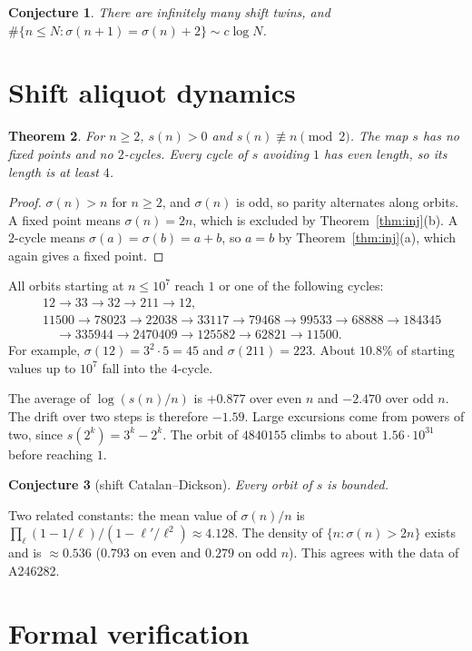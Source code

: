 \documentclass[11pt]{amsart}
\newtheorem{theorem}{Theorem}[section]
\newtheorem{conjecture}[theorem]{Conjecture}
\theoremstyle{remark}
\newcommand{\s}{\sigma}
\newcommand{\nx}[1]{#1'}
\begin{document}
\begin{conjecture}
There are infinitely many shift twins, and $\#\{n\le N: \s(n+1)=\s(n)+2\}\sim c\log N$.
\end{conjecture}

\section{Shift aliquot dynamics}

\begin{theorem}\label{thm:aliq}
For $n\ge2$, $s(n)>0$ and $s(n)\not\equiv n\pmod 2$. The map $s$ has no fixed points and no $2$-cycles. Every cycle of $s$ avoiding $1$ has even length, so its length is at least $4$.
\end{theorem}
\begin{proof}
$\s(n)>n$ for $n\ge2$, and $\s(n)$ is odd, so parity alternates along orbits. A fixed point means $\s(n)=2n$, which is excluded by Theorem~\ref{thm:inj}(b). A $2$-cycle means $\s(a)=\s(b)=a+b$, so $a=b$ by Theorem~\ref{thm:inj}(a), which again gives a fixed point.
\end{proof}

All orbits starting at $n\le 10^7$ reach $1$ or one of the following cycles:
\begin{align*}
&12\to33\to32\to211\to12,\\
&11500\to78023\to22038\to33117\to79468\to99533\to68888\to184345\\
&\quad\to335944\to2470409\to125582\to62821\to11500.
\end{align*}
For example, $\s(12)=3^2\cdot5=45$ and $\s(211)=223$. About $10.8\%$ of starting values up to $10^7$ fall into the $4$-cycle.

The average of $\log(s(n)/n)$ is $+0.877$ over even $n$ and $-2.470$ over odd $n$. The drift over two steps is therefore $-1.59$. Large excursions come from powers of two, since $s(2^k)=3^k-2^k$. The orbit of $4840155$ climbs to about $1.56\cdot10^{31}$ before reaching $1$.

\begin{conjecture}[shift Catalan--Dickson]
Every orbit of $s$ is bounded.
\end{conjecture}

Two related constants: the mean value of $\s(n)/n$ is $\prod_\ell(1-1/\ell)/(1-\nx\ell/\ell^2)\approx4.128$. The density of $\{n:\s(n)>2n\}$ exists and is $\approx0.536$ ($0.793$ on even and $0.279$ on odd $n$). This agrees with the data of A246282.

\section{Formal verification}
\end{document}
